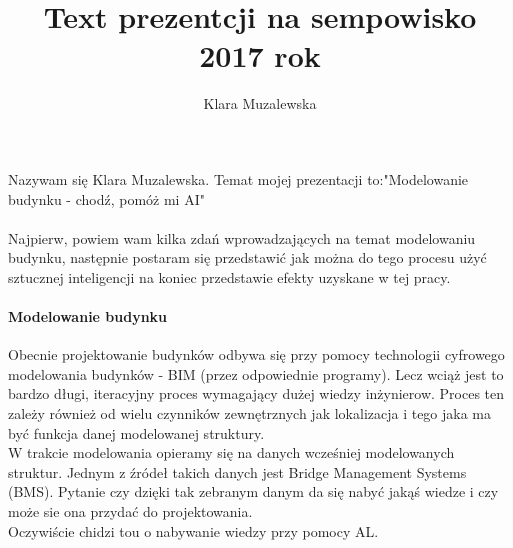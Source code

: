 \documentclass[11pt,a4paper]{article}
\author{Klara Muzalewska}
\title{Text prezentcji na sempowisko 2017 rok}
\begin{document}
\paragraph{}
Nazywam się Klara Muzalewska. Temat mojej prezentacji to:"Modelowanie budynku - chodź, pomóż mi AI"
\paragraph{}
Najpierw, powiem wam kilka zdań wprowadzających na temat modelowaniu budynku, następnie postaram się przedstawić jak można do tego procesu użyć sztucznej inteligencji na koniec przedstawie efekty uzyskane w tej pracy.
\paragraph{Modelowanie budynku}
Obecnie projektowanie budynków odbywa się przy pomocy technologii cyfrowego modelowania budynków - BIM (przez odpowiednie programy). Lecz wciąż jest to bardzo długi, iteracyjny proces wymagający dużej wiedzy inżynierow. Proces ten zależy również od wielu czynników zewnętrznych jak lokalizacja i tego jaka ma być funkcja danej modelowanej struktury.\\
W trakcie modelowania opieramy się na danych wcześniej modelowanych struktur. Jednym z źródeł takich danych jest Bridge Management Systems (BMS). Pytanie czy dzięki tak zebranym danym da się nabyć jakąś wiedze i czy może sie ona przydać do projektowania.\\
Oczywiście chidzi tou o nabywanie wiedzy przy pomocy AL.
\end{document}
